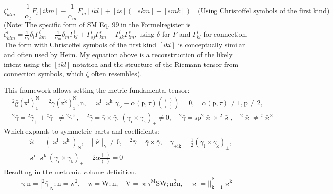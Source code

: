 \documentclass[12pt]{article}
\begin{document}
\begin{itemize}
\begin{enumerate}
\begin{equation}
        \zeta^i_{klm} = \frac{1}{\alpha_l} F_l [ikm] - \frac{1}{\alpha_m} F_m [ikl] + [is]([skm] - [smk]) \quad \text{(Using Christoffel symbols of the first kind)}
        \label{eq:original_strukturkompressor_def}
        \end{equation}
        (Note: The specific form of SM Eq. 99 in the Formelregister is \( \zeta^i_{klm} = \frac{1}{\alpha_l} \delta_l \Gamma^i_{km} - \frac{1}{\alpha_m} \delta_m \Gamma^i_{kl} + \Gamma^i_{sj}\Gamma^s_{km} - \Gamma^i_{sk}\Gamma^s_{lm} \), using \( \delta \) for \(F\) and \( \Gamma^i_{kl} \) for connection. The form with Christoffel symbols of the first kind \( [ikl] \) is conceptually similar and often used by Heim. My equation above is a reconstruction of the likely intent using the \( [ikl] \) notation and the structure of the Riemann tensor from connection symbols, which \( \zeta \) often resembles).
    \end{enumerate}
    This framework allows setting the metric fundamental tensor:
    \begin{equation}
    \begin{aligned}
    & {}^2\bar{\mathrm{g}}(\mathrm{x^l})_1^\mathrm{N} = {}^2\bar{\gamma}(\mathrm{z^k})_1^\mathrm{N}, \mathrm{n}, \quad \varkappa^\mathrm{i}\varkappa^\mathrm{k}\gamma_{\mathrm{ik}} - \alpha(\mathrm{p},\tau)\binom{(\ )}{(\ )} = 0, \quad \alpha(\mathrm{p},\tau) \neq 1, \mathrm{p} \neq 2, \\
    & {}^2\bar{\gamma} = {}^2\bar{\gamma}_+ + {}^2\bar{\gamma}_- \neq {}^2\bar{\gamma}^\times, \quad {}^2\bar{\gamma} = \bar{\gamma} \times \bar{\gamma}, \ (\gamma_{\mathrm{i}} \times \gamma_{\mathrm{k}})_\pm \neq 0, \quad {}^2\bar{\gamma} = \mathrm{sp} {}^2\bar{\varkappa} \times {}^2\bar{\varkappa}, \quad {}^2\bar{\varkappa} \neq {}^2\bar{\varkappa}^\times
    \end{aligned} \tag{84}
    \end{equation}
    Which expands to symmetric parts and coefficients:
    \begin{equation}
    \begin{aligned}
    & \hat{\varkappa} = (\varkappa^\mathrm{i}\varkappa^\mathrm{k})_\mathrm{N}, \quad |\hat{\varkappa}|_\mathrm{N} \neq 0, \quad {}^2\bar{\gamma} = \bar{\gamma} \times \bar{\gamma}, \quad \gamma_{\pm\mathrm{ik}} = \frac{1}{2}(\gamma_{\mathrm{i}} \times \gamma_{\mathrm{k}})_\pm, \\
    & \varkappa^\mathrm{i}\varkappa^\mathrm{k}(\gamma_{\mathrm{i}} \times \gamma_{\mathrm{k}})_+ - 2\alpha \frac{(\ )}{(\ )} = 0
    \end{aligned} \tag{84a}
    \end{equation}
    Resulting in the metronic volume definition:
    \begin{equation}
    \gamma; \mathrm{n} = |{}^2\bar{\gamma}|_\mathrm{N}; \mathrm{n} = \mathrm{w}^2, \quad \mathrm{w} = \mathrm{W}; \mathrm{n}, \quad \mathrm{V} = \varkappa \tau^\mathrm{M} \mathrm{S}\mathrm{W}; \mathrm{n} \bar{\delta}\mathrm{n}, \quad \varkappa = \overline{||}_{\mathrm{k}=1}^\mathrm{N} \varkappa^\mathrm{k} \tag{85}
    \end{equation}


\end{itemize}
\end{document}
